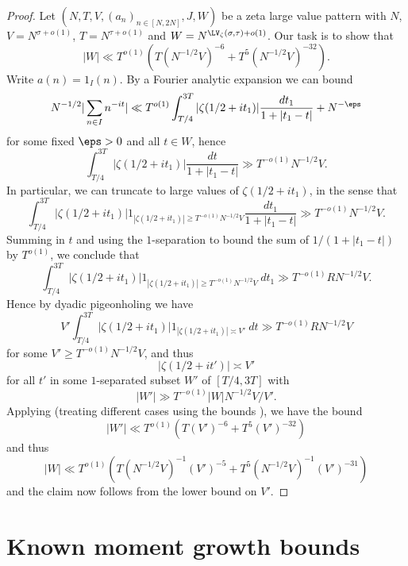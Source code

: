 \begin{proof} Let $(N,T,V,(a_n)_{n \in [N,2N]},J,W)$ be a zeta large value pattern with $N$, $V = N^{\sigma+o(1)}$, $T = N^{\tau+o(1)}$ and $W = N^{\LV_\zeta(\sigma,\tau)+o(1)}$.
Our task is to show that
$$ |W| \ll T^{o(1)} ( T (N^{-1/2} V)^{-6} + T^5 (N^{-1/2} V)^{-32}).$$
Write $a(n) = 1_I(n)$. By a Fourier analytic expansion we can bound
$$ N^{-1/2} |\sum_{n \in I} n^{-it}| \ll T^{o(1)} \int_{T/4}^{3T} |\zeta(1/2+it_1)| \frac{dt_1}{1+|t_1-t|} + N^{-\eps}$$
for some fixed $\eps>0$ and all $t \in W$, hence
$$ \int_{T/4}^{3T} |\zeta(1/2+it_1)| \frac{dt}{1+|t_1-t|} \gg T^{-o(1)} N^{-1/2} V.$$
In particular, we can truncate to large values of $\zeta(1/2+it_1)$, in the sense that
$$ \int_{T/4}^{3T} |\zeta(1/2+it_1)| 1_{|\zeta(1/2+it_1)| \geq T^{-o(1)} N^{-1/2} V} \frac{dt_1}{1+|t_1-t|} \gg T^{-o(1)} N^{-1/2} V.$$
Summing in $t$ and using the $1$-separation to bound the sum of $1/(1+|t_1-t|)$ by $T^{o(1)}$, we conclude that
$$ \int_{T/4}^{3T} |\zeta(1/2+it_1)| 1_{|\zeta(1/2+it_1)| \geq T^{-o(1)} N^{-1/2} V} \ dt_1 \gg T^{-o(1)} R N^{-1/2} V.$$
Hence by dyadic pigeonholing we have
$$ V' \int_{T/4}^{3T} |\zeta(1/2+it_1)| 1_{|\zeta(1/2+it_1)| \asymp V'} \ dt \gg T^{-o(1)} R N^{-1/2} V$$
for some $V' \geq T^{-o(1)} N^{-1/2} V$, and thus
$$ |\zeta(1/2+it')| \asymp V'$$
for all $t'$ in some $1$-separated subset $W'$ of $[T/4, 3T]$ with
$$ |W'| \gg T^{-o(1)} |W| N^{-1/2} V / V'.$$
Applying \cite[Theorem 2]{heathbrown_twelfth_1978} (treating different cases using the bounds \cite[(7), (8), (9)]{heathbrown_twelfth_1978}), we have the bound
$$ |W'| \ll T^{o(1)} ( T (V')^{-6} + T^5 (V')^{-32})$$
and thus
$$ |W| \ll T^{o(1)} ( T (N^{-1/2} V)^{-1} (V')^{-5} + T^5 (N^{-1/2} V)^{-1} (V')^{-31})$$
and the claim now follows from the lower bound on $V'$.
\end{proof}

\section{Known moment growth bounds}

